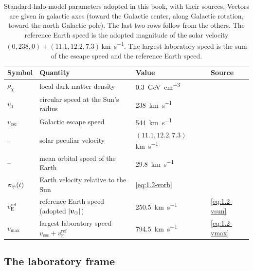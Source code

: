 \begin{table}[t]
  \centering
  \caption{Standard-halo-model parameters adopted in this book, with their sources. Vectors are given in galactic axes (toward the Galactic center, along Galactic rotation, toward the north Galactic pole). The last two rows follow from the others. The reference Earth speed is the adopted magnitude of the solar velocity $(0, 238, 0) + (11.1, 12.2, 7.3)$\,\si{km.s^{-1}}. The largest laboratory speed is the sum of the escape speed and the reference Earth speed.}
  \label{tab:1-shm}
  \begin{tabular}{@{}llll@{}}
    \toprule
    Symbol & Quantity & Value & Source \\
    \midrule
    $\rho_\chi$ & local dark-matter density & \SI{0.3}{GeV.cm^{-3}} & \cite[Table~1]{baxter2021recommended} \\
    $v_0$ & circular speed at the Sun's radius & \SI{238}{km.s^{-1}} & \cite[Table~1]{baxter2021recommended} \\
    $v_{\mathrm{esc}}$ & Galactic escape speed & \SI{544}{km.s^{-1}} & \cite[Table~1]{baxter2021recommended} \\
    -- & solar peculiar velocity & $(11.1, 12.2, 7.3)$\,\si{km.s^{-1}} & \cite[Table~1]{baxter2021recommended} \\
    -- & mean orbital speed of the Earth & \SI{29.8}{km.s^{-1}} & \cite[Eq.~(13)]{baxter2021recommended} \\
    $\bm{v}_\oplus(t)$ & Earth velocity relative to the Sun & \cref{eq:1.2-vorb} & \cite[Eq.~(11)]{baxter2021recommended} \\
    $v_{\mathrm{E}}^{\mathrm{ref}}$ & reference Earth speed (adopted $|\bm{v}_\odot|$) & \SI{250.5}{km.s^{-1}} & \cref{eq:1.2-vsun} \\
    $v_{\mathrm{max}}$ & largest laboratory speed $v_{\mathrm{esc}} + v_{\mathrm{E}}^{\mathrm{ref}}$ & \SI{794.5}{km.s^{-1}} & \cref{eq:1.2-vmax} \\
    \bottomrule
  \end{tabular}
\end{table}

\subsection{The laboratory frame}

